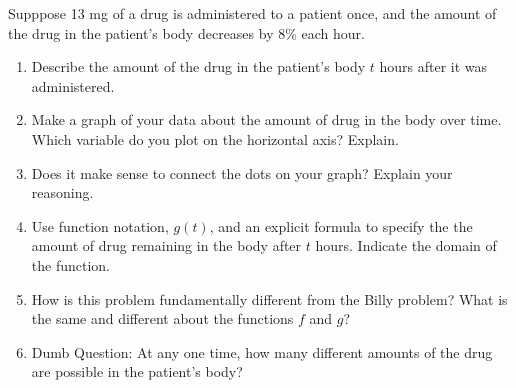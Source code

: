 \begin{prob}
Supppose 13 mg of a drug is administered to a patient once, and the amount of the drug in the patient's body decreases by 8\% each hour.  
\begin{enumerate}
\item Describe the amount of the drug in the patient's body $t$ hours after it was administered.  

\item Make a graph of your data about the amount of drug in the body over time.  Which variable do you plot on the horizontal axis?  Explain.  

\item Does it make sense to connect the dots on your graph?  Explain your reasoning.  

\item Use function notation, $g(t)$, and an explicit formula to specify the the amount of drug remaining in the body after $t$ hours.  Indicate the domain of the function. 

\item How is this problem fundamentally different from the Billy problem?  What is the same and different about the functions $f$ and $g$?  

\item Dumb Question:  At any one time, how many different amounts of the drug are possible in the patient's body?
\end{enumerate}
\end{prob}
